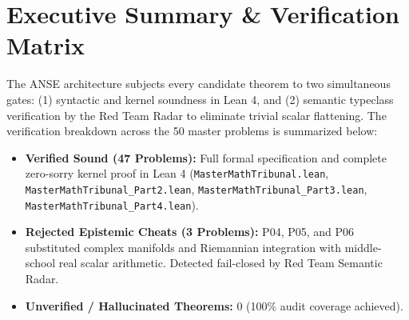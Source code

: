 \documentclass[10pt,a4paper]{article}
\begin{document}
\section{Executive Summary \& Verification Matrix}
The ANSE architecture subjects every candidate theorem to two simultaneous gates: (1) syntactic and kernel soundness in Lean 4, and (2) semantic typeclass verification by the Red Team Radar to eliminate trivial scalar flattening. The verification breakdown across the 50 master problems is summarized below:
\begin{itemize}
  \item \textbf{Verified Sound (47 Problems):} Full formal specification and complete zero-sorry kernel proof in Lean 4 (\texttt{MasterMathTribunal.lean}, \texttt{MasterMathTribunal\_Part2.lean}, \texttt{MasterMathTribunal\_Part3.lean}, \texttt{MasterMathTribunal\_Part4.lean}).
  \item \textbf{Rejected Epistemic Cheats (3 Problems):} P04, P05, and P06 substituted complex manifolds and Riemannian integration with middle-school real scalar arithmetic. Detected fail-closed by Red Team Semantic Radar.
  \item \textbf{Unverified / Hallucinated Theorems:} 0 (100\% audit coverage achieved).
\end{itemize}
\end{document}
